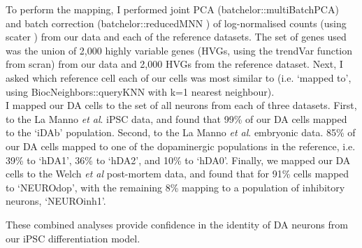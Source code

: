 To perform the mapping, I performed joint PCA (batchelor::multiBatchPCA) 
and batch correction (batchelor::reducedMNN \cite{haghverdi2018batch}) of log-normalised counts (using scater \cite{mccarthy2017scater}) from our data and each of the reference datasets. 
The set of genes used was the union of 2,000 highly variable genes (HVGs, using the trendVar function from scran) 
from our data and 2,000 HVGs from the reference dataset. 
Next, I asked which reference cell each of our cells was most similar to (i.e. ‘mapped to', using BiocNeighbors::queryKNN with k=1 nearest neighbour).\\

I mapped our DA cells to the set of all neurons from each of three datasets.
First, to the La Manno \textit{et al}. iPSC data, and found that
99\% of our DA cells mapped to the `iDAb' population.
Second, to the La Manno \textit{et al}. embryonic data. 
85\% of our DA cells mapped to one of the dopaminergic populations in the reference, i.e. 39\% to `hDA1', 36\% to `hDA2', and 10\% to `hDA0'.
Finally, we mapped our DA cells to the Welch \textit{et al} post-mortem data, and found that for 91\% cells mapped to `NEUROdop', with the remaining 8\% mapping to a population of inhibitory neurons, `NEUROinh1'.

These combined analyses provide confidence in the identity of DA neurons from our iPSC differentiation model.







